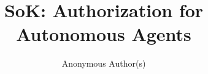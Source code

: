 \documentclass[sigconf,anonymous,review]{acmart}
\title{SoK: Authorization for Autonomous Agents}
\author{Anonymous Author(s)}
\affiliation{\institution{Submitted for double-blind review}\country{}}
\begin{document}

\gdef\keywayabstractdone{}
\maketitle




\end{document}
